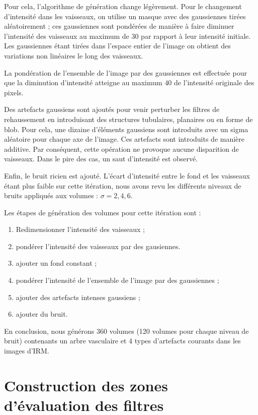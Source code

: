 Pour cela, l'algorithme de génération change légèrement. Pour le changement d'intensité dans les vaisseaux, on utilise un masque avec des gaussiennes tirées aléatoirement ; ces gaussiennes sont pondérées de manière à faire diminuer l'intensité des vaisseaux au maximum de $30$ \percent{} par rapport à leur intensité initiale. Les gaussiennes étant tirées dans l'espace entier de l'image on obtient des variations non linéaires le long des vaisseaux.

La pondération de l'ensemble de l'image par des gaussiennes est effectuée pour que la diminution d'intensité atteigne au maximum $40$ \percent{} de l'intensité originale des pixels.

Des artefacts gaussiens sont ajoutés pour venir perturber les filtres de rehaussement en introduisant des structures tubulaires, planaires ou en forme de blob. Pour cela, une dizaine d'éléments gaussiens sont introduits avec un sigma aléatoire pour chaque axe de l'image. Ces artefacts sont introduits de manière additive. Par conséquent, cette opération ne provoque aucune disparition de vaisseaux. Dans le pire des cas, un saut d'intensité est observé.

Enfin, le bruit ricien est ajouté. L'écart d'intensité entre le fond et les vaisseaux étant plus faible sur cette itération, nous avons revu les différents niveaux de bruits appliqués aux volumes : $\sigma={2,4,6}$.

Les étapes de génération des volumes pour cette itération sont :

\begin{enumerate}
  \item Redimensionner l'intensité des vaisseaux ;
  \item pondérer l'intensité des vaisseaux par des gausiennes.
  \item ajouter un fond constant ; 
  \item pondérer l'intensité de l'ensemble de l'image par des gaussiennes ;
  \item ajouter des artefacts intenses gaussiens ;
  \item ajouter du bruit.
  \end{enumerate}

En conclusion, nous générons 360 volumes (120 volumes pour chaque niveau de bruit) contenants un arbre vasculaire et 4 types d'artefacts courants dans les images d'IRM.
 
\section{Construction des zones d'évaluation des filtres}

